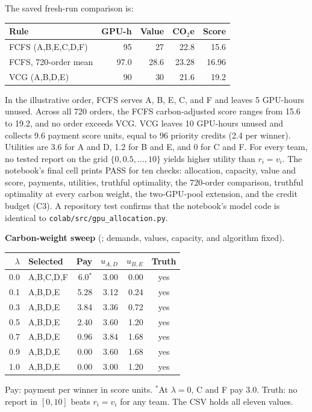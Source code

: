 The saved fresh-run comparison is:

\begin{center}
\small\setlength{\tabcolsep}{3pt}
\begin{tabularx}{\columnwidth}{@{}Yrrrr@{}}
\toprule
Rule & GPU-h & Value & CO$_2$e & Score \\
\midrule
FCFS (A,B,E,C,D,F) & 95 & 27 & 22.8 & 15.6 \\
FCFS, 720-order mean & 97.0 & 28.6 & 23.28 & 16.96 \\
VCG (A,B,D,E) & 90 & 30 & 21.6 & 19.2 \\
\bottomrule
\end{tabularx}
\end{center}

In the illustrative order, FCFS serves A, B, E, C, and F and leaves 5 GPU-hours unused. Across all 720 orders, the FCFS carbon-adjusted score ranges from 15.6 to 19.2, and no order exceeds VCG. VCG leaves 10 GPU-hours unused and collects 9.6 payment score units, equal to 96 priority credits (2.4 per winner). Utilities are 3.6 for A and D, 1.2 for B and E, and 0 for C and F. For every team, no tested report on the grid $\{0,0.5,\dots,10\}$ yields higher utility than $r_i=v_i$. The notebook's final cell prints PASS for ten checks: allocation, capacity, value and score, payments, utilities, truthful optimality, the 720-order comparison, truthful optimality at every carbon weight, the two-GPU-pool extension, and the credit budget (C3). A repository test confirms that the notebook's model code is identical to \texttt{colab/src/gpu\_allocation.py}.

\textbf{Carbon-weight sweep} (; demands, values, capacity, and algorithm fixed).

\begin{center}
\footnotesize\setlength{\tabcolsep}{3pt}
\begin{tabularx}{\columnwidth}{@{}rYrrrc@{}}
\toprule
$\lambda$ & Selected & Pay & $u_{A,D}$ & $u_{B,E}$ & Truth \\
 & A,B,C,D,F & 6.0$^{*}$ & 3.00 & 0.00 & yes \\
0.1 & A,B,D,E & 5.28 & 3.12 & 0.24 & yes \\
0.3 & A,B,D,E & 3.84 & 3.36 & 0.72 & yes \\
0.5 & A,B,D,E & 2.40 & 3.60 & 1.20 & yes \\
0.7 & A,B,D,E & 0.96 & 3.84 & 1.68 & yes \\
0.9 & A,B,D,E & 0.00 & 3.60 & 1.68 & yes \\
1.0 & A,B,D,E & 0.00 & 3.00 & 1.20 & yes \\
\bottomrule
\end{tabularx}
\end{center}
{\footnotesize Pay: payment per winner in score units. $^{*}$At $\lambda=0$, C and F pay 3.0. Truth: no report in $[0,10]$ beats $r_i=v_i$ for any team. The CSV holds all eleven values.}


